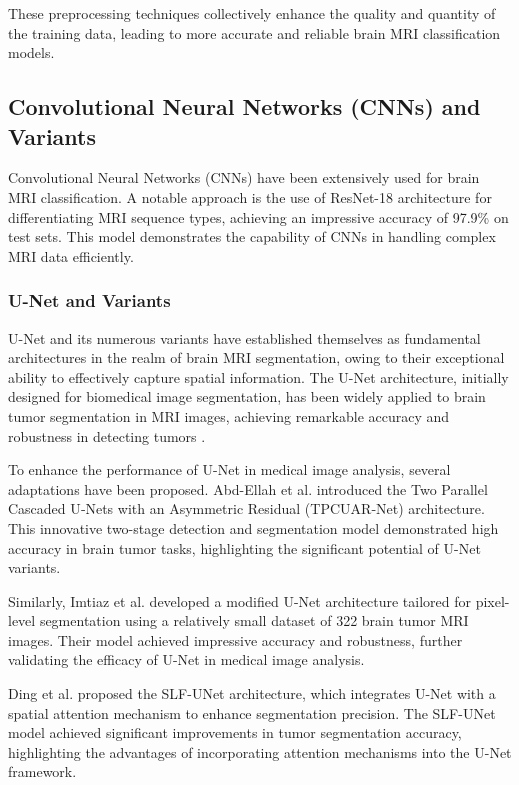 These preprocessing techniques collectively enhance the quality and quantity of the training data, leading to more accurate and reliable brain MRI classification models.

\subsection{Convolutional Neural Networks (CNNs) and Variants}

Convolutional Neural Networks (CNNs) have been extensively used for brain MRI classification. A notable approach is the use of ResNet-18 architecture for differentiating MRI sequence types, achieving an impressive accuracy of 97.9\% on test sets. This model demonstrates the capability of CNNs in handling complex MRI data efficiently\cite{doi:10.1148/ryai.230095}.

\subsubsection{U-Net and Variants}

U-Net and its numerous variants have established themselves as fundamental architectures in the realm of brain MRI segmentation, owing to their exceptional ability to effectively capture spatial information. The U-Net architecture, initially designed for biomedical image segmentation, has been widely applied to brain tumor segmentation in MRI images, achieving remarkable accuracy and robustness in detecting tumors \cite{imtiaz_brain_2023, abd-ellah_automatic_2024, ding_slf-unet_2024}.

To enhance the performance of U-Net in medical image analysis, several adaptations have been proposed. Abd-Ellah et al. \cite{abd-ellah_automatic_2024} introduced the Two Parallel Cascaded U‑Nets with an Asymmetric Residual (TPCUAR‑Net) architecture. This innovative two-stage detection and segmentation model demonstrated high accuracy in brain tumor tasks, highlighting the significant potential of U-Net variants.

Similarly, Imtiaz et al. \cite{imtiaz_brain_2023} developed a modified U-Net architecture tailored for pixel-level segmentation using a relatively small dataset of 322 brain tumor MRI images. Their model achieved impressive accuracy and robustness, further validating the efficacy of U-Net in medical image analysis.

Ding et al. \cite{ding_slf-unet_2024} proposed the SLF-UNet architecture, which integrates U-Net with a spatial attention mechanism to enhance segmentation precision. The SLF-UNet model achieved significant improvements in tumor segmentation accuracy, highlighting the advantages of incorporating attention mechanisms into the U-Net framework.

